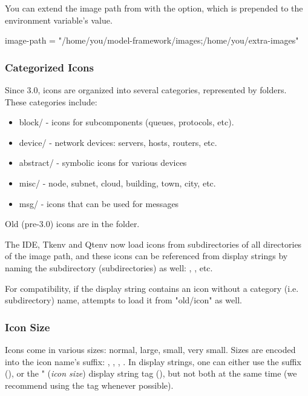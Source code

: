 You can extend the image path from  with the
 option, which is prepended to the environment
variable's value.

\begin{inifile}
[General]
image-path = "/home/you/model-framework/images;/home/you/extra-images"
\end{inifile}


\subsubsection{Categorized Icons}

Since {\opp} 3.0, icons are organized into several categories, represented
by folders. These categories include:

\begin{itemize}
  \item block/ - icons for subcomponents (queues, protocols, etc).
  \item device/ - network devices: servers, hosts, routers, etc.
  \item abstract/ - symbolic icons for various devices
  \item misc/ - node, subnet, cloud, building, town, city, etc.
  \item msg/ - icons that can be used for messages
\end{itemize}

Old (pre-3.0) icons are in the  folder.

The IDE, Tkenv and Qtenv now load icons from subdirectories of all directories
of the image path, and these icons can be referenced from display strings
by naming the subdirectory (subdirectories) as well:
, , etc.

For compatibility, if the display string contains an icon without
a category (i.e. subdirectory) name, {\opp} attempts to load it from "old/icon" as well.

\subsubsection{Icon Size}

Icons come in various sizes: normal, large, small, very small. Sizes are
encoded into the icon name's suffix: , , , .
In display strings, one can either use the suffix (),
or the " (\textit{icon size}) display string tag (),
but not both at the same time (we recommend using the  tag whenever possible).

